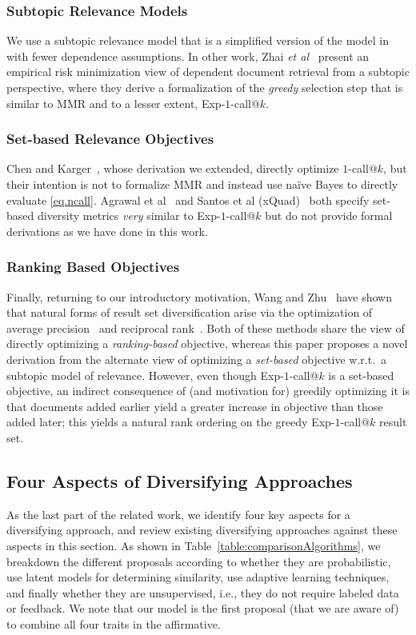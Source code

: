 \subsubsection{Subtopic Relevance Models} 
We use a subtopic relevance
model that is a simplified version of the model in~\cite{plmmr} with
fewer dependence assumptions.  In other work, Zhai {\it et
al}~\cite{zhai03Beyond} present an empirical risk minimization view of
dependent document retrieval from a subtopic perspective,
where they derive a formalization of the
\emph{greedy} selection step that is similar to MMR and to a lesser
extent, Exp-$1$-call@$k$.

\subsubsection{Set-based Relevance Objectives} 
Chen and Karger~\cite{chen06Less}, whose derivation we extended, directly
optimize $1$-call@$k$, but their intention is not to formalize MMR and
instead use na\"{i}ve Bayes to directly evaluate
\eqref{eq.ncall}.  Agrawal et al~\cite{agrawal09diversifying}
and Santos et al (xQuad)~\cite{santos2010xquad} both specify set-based
diversity metrics \emph{very} similar to Exp-$1$-call@$k$ but do not provide
formal derivations as we have done in this work. 

\subsubsection{Ranking Based Objectives} 
Finally, returning to our introductory motivation, Wang and Zhu~\cite{wangzhu10} have shown that
natural forms of result set diversification arise via the optimization
of average precision~\cite{ap} and reciprocal rank~\cite{mrr}.  Both
of these methods share the view of directly optimizing a
\emph{ranking-based} objective, whereas this paper proposes a novel
derivation from the alternate view of optimizing a \emph{set-based}
objective w.r.t.\ a subtopic model of relevance.  However, even though
Exp-$1$-call@$k$ is a set-based objective, an indirect consequence of
(and motivation for) greedily optimizing it is that documents added
earlier yield a greater increase in objective than those added later;
this yields a natural rank ordering on the greedy Exp-$1$-call@$k$
result set.

\subsection{Four Aspects of Diversifying Approaches}
As the last part of the related work, we identify four key aspects for a diversifying approach, and review existing diversifying approaches against these aspects in this section. As shown in Table~\ref{table:comparisonAlgorithms}, we breakdown the
different proposals according to whether they are probabilistic, use
latent models for determining similarity, use adaptive learning
techniques, and finally whether they are unsupervised, i.e., they do
not require labeled data or feedback. We note that our model is the first
proposal (that we are aware of) to combine all four traits in the
affirmative. 

